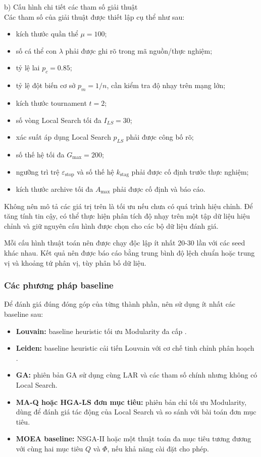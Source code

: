 \documentclass[14pt,a4paper]{extarticle}
\begin{document}
\noindent b) Cấu hình chi tiết các tham số giải thuật \\ \indent
Các tham số của giải thuật được thiết lập cụ thể như sau:
\begin{itemize}
    \item kích thước quần thể $\mu=100$;
    \item số cá thể con $\lambda$ phải được ghi rõ trong mã nguồn/thực nghiệm;
    \item tỷ lệ lai $p_c=0.85$;
    \item tỷ lệ đột biến cơ sở $p_m=1/n$, cần kiểm tra độ nhạy trên mạng lớn;
    \item kích thước tournament $t=2$;
    \item số vòng Local Search tối đa $I_{LS}=30$;
    \item xác suất áp dụng Local Search $p_{LS}$ phải được công bố rõ;
    \item số thế hệ tối đa $G_{\max}=200$;
    \item ngưỡng trì trệ $\varepsilon_{\mathrm{stop}}$ và số thế hệ $k_{\mathrm{stag}}$ phải được cố định trước thực nghiệm;
    \item kích thước archive tối đa $A_{\max}$ phải được cố định và báo cáo.
\end{itemize}

Không nên mô tả các giá trị trên là tối ưu nếu chưa có quá trình hiệu chỉnh. Để tăng tính tin cậy, có thể thực hiện phân tích độ nhạy trên một tập dữ liệu hiệu chỉnh và giữ nguyên cấu hình được chọn cho các bộ dữ liệu đánh giá.

Mỗi cấu hình thuật toán nên được chạy độc lập ít nhất 20-30 lần với các seed khác nhau. Kết quả nên được báo cáo bằng trung bình độ lệch chuẩn hoặc trung vị và khoảng tứ phân vị, tùy phân bố dữ liệu.

\subsubsection{Các phương pháp baseline}

Để đánh giá đúng đóng góp của từng thành phần, nên sử dụng ít nhất các baseline sau:
\begin{itemize}
    \item \textbf{Louvain:} baseline heuristic tối ưu Modularity đa cấp \cite{Blondel2008}.
    \item \textbf{Leiden:} baseline heuristic cải tiến Louvain với cơ chế tinh chỉnh phân hoạch \cite{Traag2019}.
    \item \textbf{GA:} phiên bản GA sử dụng cùng LAR và các tham số chính nhưng không có Local Search.
    \item \textbf{MA-Q hoặc HGA-LS đơn mục tiêu:} phiên bản chỉ tối ưu Modularity, dùng để đánh giá tác động của Local Search và so sánh với bài toán đơn mục tiêu.
    \item \textbf{MOEA baseline:} NSGA-II hoặc một thuật toán đa mục tiêu tương đương với cùng hai mục tiêu $Q$ và $\Phi$, nếu khả năng cài đặt cho phép.
\end{itemize}
\end{document}
